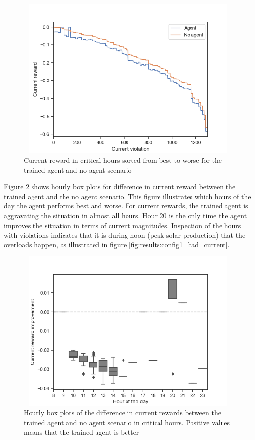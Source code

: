 \documentclass[class=book, crop=false]{standalone}
\begin{document}
\begin{figure}[H]
    \center
\includegraphics[height=8cm, width=12cm]{figures/config1_sorted_current.png}
    \caption[size = 9]{Current reward in critical hours sorted from best to worse for the trained agent and no agent scenario}
    \label{fig:results:config1_sorted_current}
\end{figure}

Figure \ref{fig:results:config1_improvement_current} shows hourly box plots for difference in current reward between the trained agent and the no agent scenario. This figure illustrates which hours of the day the agent performs best and worse. For current rewards, the trained agent is aggravating the situation in almost all hours. Hour 20 is the only time the agent improves the situation in terms of current magnitudes. Inspection of the hours with violations indicates that it is during noon (peak solar production) that the overloads happen, as illustrated in figure \ref{fig:results:config1_bad_current}.

\begin{figure}[h]
    \center
\includegraphics[height=8cm, width=12cm]{figures/config1_improvement_current.png}
    \caption[size = 9]{Hourly box plots of the difference in current rewards between the trained agent and no agent scenario in critical hours. Positive values means that the trained agent is better}
    \label{fig:results:config1_improvement_current}
\end{figure}
\end{document}
